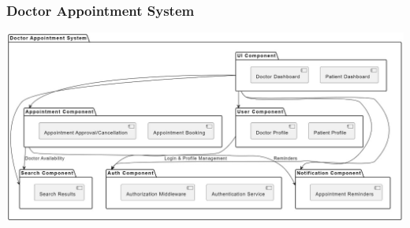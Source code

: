 \documentclass[a4paper, 12pt]{article}
\begin{document}
\subsubsection{Doctor Appointment System}
\begin{center}
\includegraphics[width=1\textwidth]{component.jpeg}\par
\end{center}
\end{document}
